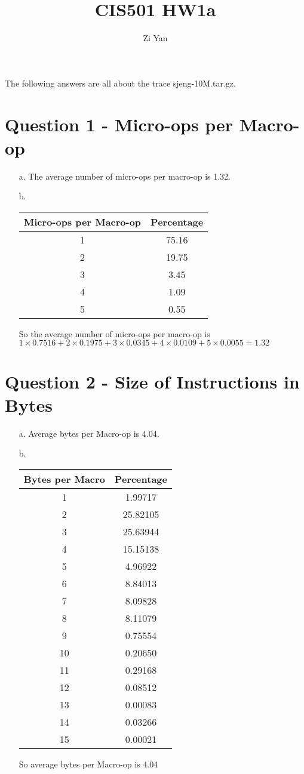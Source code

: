 \documentclass[12pt,letterpaper]{article}
\author{Zi Yan}
\title{CIS501 HW1a}
\date{}
\begin{document}
\maketitle

The following answers are all about the trace sjeng-10M.tar.gz.

 \section*{Question 1 - Micro-ops per Macro-op}
 \begin{itemize}
     \item[a.] The average number of micro-ops per macro-op is 1.32.
    
     \item[b.] 
\begin{tabular}{|c|c|}
\hline 
Micro-ops per Macro-op & Percentage\\
\hline
1 & 75.16 \\ 
\hline 
2 & 19.75 \\ 
\hline 
3 & 3.45 \\ 
\hline 
4 & 1.09 \\ 
\hline 
5 & 0.55 \\ 
\hline 
\end{tabular} 

So the average number of micro-ops per macro-op is 
$1\times 0.7516 + 2 \times 0.1975 + 3 \times 0.0345 + 4 \times
 0.0109 + 5 \times 0.0055 = 1.32$
 \end{itemize}
 \section*{Question 2 - Size of Instructions in Bytes}
 \begin{itemize}
     \item[a.] Average bytes per Macro-op is 4.04.
     \item[b.]
     \begin{tabular}{|c|c|}
\hline 
Bytes per Macro & Percentage \\ 
\hline 
1 & 1.99717 \\ 
\hline 
2 & 25.82105 \\ 
\hline 
3 & 25.63944 \\ 
\hline 
4 & 15.15138 \\ 
\hline 
5 & 4.96922 \\ 
\hline 
6 & 8.84013 \\ 
\hline 
7 & 8.09828 \\ 
\hline 
8 & 8.11079 \\ 
\hline 
9 & 0.75554 \\ 
\hline 
10 & 0.20650 \\ 
\hline 
11 & 0.29168 \\ 
\hline 
12 & 0.08512 \\ 
\hline 
13 & 0.00083 \\ 
\hline 
14 & 0.03266 \\ 
\hline 
15 & 0.00021 \\ 
\hline 
\end{tabular} 

So average bytes per Macro-op is 4.04
 \end{itemize}
\end{document}
